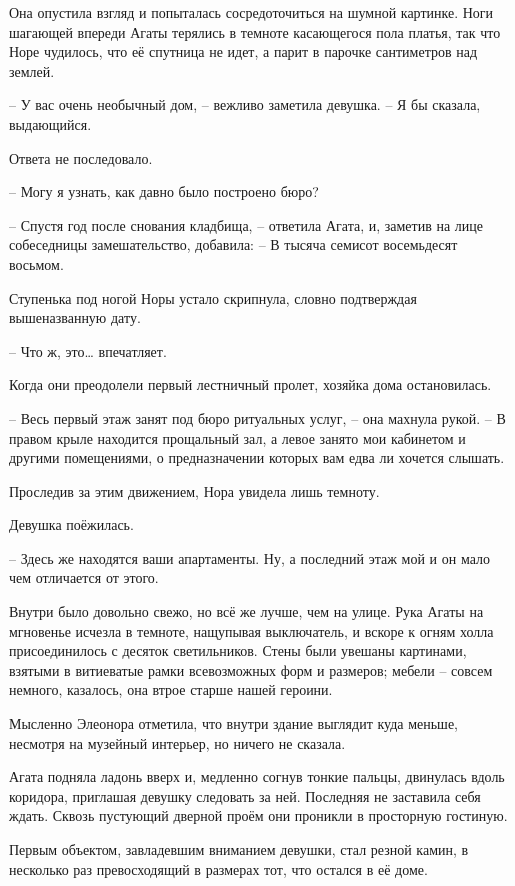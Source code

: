 \documentclass[
  a5paperpaper,
  DIV=11,
  numbers=noendperiod]{scrreprt}
\begin{document}
Она опустила взгляд и попыталась сосредоточиться на шумной картинке.
Ноги шагающей впереди Агаты терялись в темноте касающегося пола платья,
так что Норе чудилось, что её спутница не идет, а парит в парочке
сантиметров над землей.

-- У вас очень необычный дом, -- вежливо заметила девушка. -- Я бы
сказала, выдающийся.

Ответа не последовало.

-- Могу я узнать, как давно было построено бюро?

-- Спустя год после снования кладбища, -- ответила Агата, и, заметив на
лице собеседницы замешательство, добавила: -- В тысяча семисот
восемьдесят восьмом.

Ступенька под ногой Норы устало скрипнула, словно подтверждая
вышеназванную дату.

-- Что ж, это\ldots{} впечатляет.

Когда они преодолели первый лестничный пролет, хозяйка дома
остановилась.

-- Весь первый этаж занят под бюро ритуальных услуг, -- она махнула
рукой. -- В правом крыле находится прощальный зал, а левое занято мои
кабинетом и другими помещениями, о предназначении которых вам едва ли
хочется слышать.

Проследив за этим движением, Нора увидела лишь темноту.

Девушка поёжилась.

-- Здесь же находятся ваши апартаменты. Ну, а последний этаж мой и он
мало чем отличается от этого.

Внутри было довольно свежо, но всё же лучше, чем на улице. Рука Агаты на
мгновенье исчезла в темноте, нащупывая выключатель, и вскоре к огням
холла присоединилось с десяток светильников. Стены были увешаны
картинами, взятыми в витиеватые рамки всевозможных форм и размеров;
мебели -- совсем немного, казалось, она втрое старше нашей героини.

Мысленно Элеонора отметила, что внутри здание выглядит куда меньше,
несмотря на музейный интерьер, но ничего не сказала.

Агата подняла ладонь вверх и, медленно согнув тонкие пальцы, двинулась
вдоль коридора, приглашая девушку следовать за ней. Последняя не
заставила себя ждать. Сквозь пустующий дверной проём они проникли в
просторную гостиную.

Первым объектом, завладевшим вниманием девушки, стал резной камин, в
несколько раз превосходящий в размерах тот, что остался в её доме.
\end{document}
